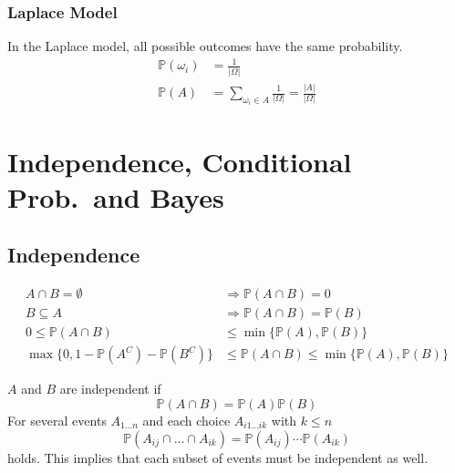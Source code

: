 \subsubsection{Laplace Model}
In the Laplace model, all possible outcomes have the same probability.
\noindent\begin{align*}
    \mathbb{P}(\omega_i) & = \frac{1}{|\Omega|}                                             \\
    \mathbb{P}(A)        & = \sum_{\omega_i \in A}\frac{1}{|\Omega|} = \frac{|A|}{|\Omega|}
\end{align*}

\section{Independence, Conditional Prob.\ and Bayes}
\subsection{Independence}

\noindent\begin{align*}
    A \cap B = \emptyset                          & \Rightarrow \mathbb{P}(A\cap B) = 0                                 \\
    B \subseteq A                                 & \Rightarrow \mathbb{P}(A\cap B) = \mathbb{P}(B)                     \\
    0 \leq \mathbb{P}(A\cap B)                    & \leq \min\{\mathbb{P}(A), \mathbb{P}(B)\}                           \\
    \max\{0, 1-\mathbb{P}(A^C) -\mathbb{P}(B^C)\} & \leq \mathbb{P}(A\cap B) \leq \min\{ \mathbb{P}(A), \mathbb{P}(B)\}
\end{align*}


$A$ and $B$ are independent if
\noindent\begin{equation*}
    \mathbb{P}(A\cap B) = \mathbb{P}(A)\mathbb{P}(B)
\end{equation*}
For several events $A_{1\dots n}$ and each choice $A_{i1\dots ik}$ with $k\leq n$
\noindent\begin{equation*}
    \mathbb{P}(A_{ij} \cap \dots \cap A_{ik}) = \mathbb{P}(A_{ij}) \cdots \mathbb{P}(A_{ik})
\end{equation*}
holds. This implies that each subset of events must be independent as well.



